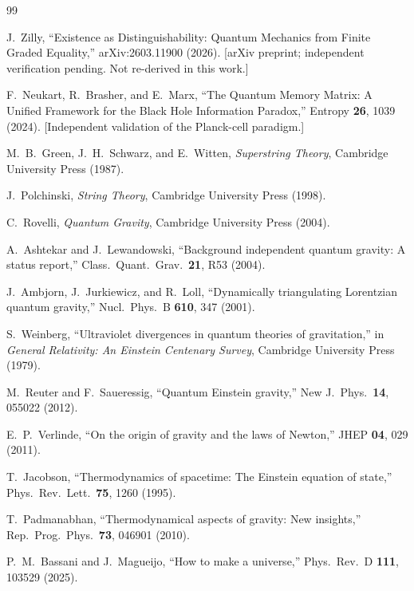 \documentclass[aps,prd,twocolumn,showpacs,superscriptaddress,preprintnumbers]{revtex4-2}
\begin{document}

\begin{thebibliography}{99}

J.~Zilly, ``Existence as Distinguishability: Quantum Mechanics from Finite Graded Equality,''
arXiv:2603.11900 (2026).
[arXiv preprint; independent verification pending. Not re-derived in this work.]

F.~Neukart, R.~Brasher, and E.~Marx,
``The Quantum Memory Matrix: A Unified Framework for the Black Hole Information Paradox,''
Entropy \textbf{26}, 1039 (2024).
[Independent validation of the Planck-cell paradigm.]

M.~B.~Green, J.~H.~Schwarz, and E.~Witten,
\textit{Superstring Theory},
Cambridge University Press (1987).

J.~Polchinski,
\textit{String Theory},
Cambridge University Press (1998).

C.~Rovelli,
\textit{Quantum Gravity},
Cambridge University Press (2004).

A.~Ashtekar and J.~Lewandowski,
``Background independent quantum gravity: A status report,''
Class.\ Quant.\ Grav.\ \textbf{21}, R53 (2004).

J.~Ambjorn, J.~Jurkiewicz, and R.~Loll,
``Dynamically triangulating Lorentzian quantum gravity,''
Nucl.\ Phys.\ B \textbf{610}, 347 (2001).

S.~Weinberg,
``Ultraviolet divergences in quantum theories of gravitation,''
in \textit{General Relativity: An Einstein Centenary Survey},
Cambridge University Press (1979).

M.~Reuter and F.~Saueressig,
``Quantum Einstein gravity,''
New J.\ Phys.\ \textbf{14}, 055022 (2012).

E.~P.~Verlinde,
``On the origin of gravity and the laws of Newton,''
JHEP \textbf{04}, 029 (2011).

T.~Jacobson,
``Thermodynamics of spacetime: The Einstein equation of state,''
Phys.\ Rev.\ Lett.\ \textbf{75}, 1260 (1995).

T.~Padmanabhan,
``Thermodynamical aspects of gravity: New insights,''
Rep.\ Prog.\ Phys.\ \textbf{73}, 046901 (2010).

P.~M.~Bassani and J.~Magueijo,
``How to make a universe,''
Phys.\ Rev.\ D \textbf{111}, 103529 (2025).


\end{thebibliography}
\end{document}
